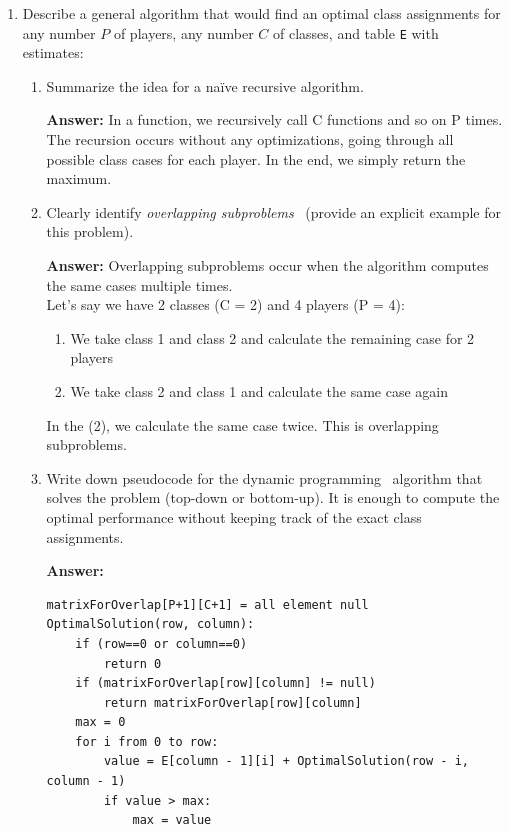 \documentclass[dvipsnames]{article}
\begin{document}
  \begin{enumerate}
    \item Describe a general algorithm that would find an optimal class assignments
      for any number $P$ of players, any number $C$ of classes, and table \texttt{E} with estimates:
      \begin{enumerate}
        \item Summarize the idea for a na\"ive recursive algorithm.

        \color{blue}
        \textbf{Answer:} In a function, we recursively call C functions and so on P times. The recursion occurs without any optimizations, going through all possible class cases for each player. In the end, we simply return the maximum.
        \color{black}

        \item Clearly identify \emph{overlapping subproblems}~\cite[\S 14.3]{Cormen2022} (provide an explicit example for this problem).

        \color{blue}
        \textbf{Answer:} Overlapping subproblems occur when the algorithm computes the same cases multiple times.\\Let's say we have 2 classes (C = 2) and 4 players (P = 4):\\
        \begin{enumerate}
            \item We take class 1 and class 2 and calculate the remaining case for 2 players\\
            \item We take class 2 and class 1 and calculate the same case again\\
        \end{enumerate}
In the (2), we calculate the same case twice. This is overlapping subproblems.
        \color{black}

        \item Write down pseudocode for the dynamic programming~\cite[\S 14]{Cormen2022} algorithm that solves the problem (top-down or bottom-up).
          It is enough to compute the optimal performance without keeping track of the exact class assignments.

        \color{blue}
        \textbf{Answer:}\\
        \begin{verbatim}
matrixForOverlap[P+1][C+1] = all element null
OptimalSolution(row, column):
    if (row==0 or column==0)
        return 0
    if (matrixForOverlap[row][column] != null)
        return matrixForOverlap[row][column]
    max = 0
    for i from 0 to row:
        value = E[column - 1][i] + OptimalSolution(row - i, column - 1)
        if value > max:
            max = value


\end{verbatim}
\end{enumerate}
\end{enumerate}
\end{document}
